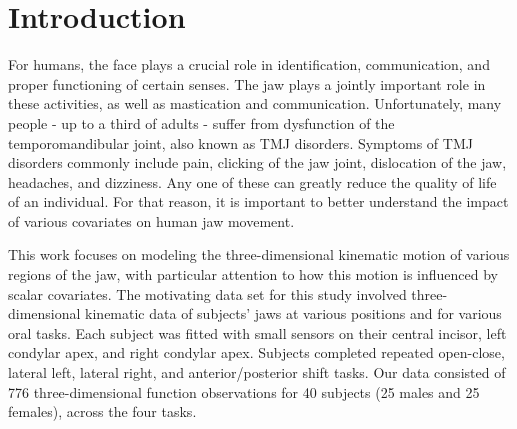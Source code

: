 \documentclass[AMA,Times1COL]{WileyNJDv5} %
\begin{document}



\maketitle



\section{Introduction}\label{sec1}

For humans, the face plays a crucial role in identification, communication, and proper functioning of certain senses.  The jaw plays a jointly important role in these activities, as well as mastication and communication.  Unfortunately, many people - up to a third of adults - suffer from dysfunction of the temporomandibular joint, also known as TMJ disorders\cite{buescher_temporomandibular_2007}.  Symptoms of TMJ disorders commonly include pain, clicking of the jaw joint, dislocation of the jaw, headaches, and dizziness.  Any one of these can greatly reduce the quality of life of an individual.  For that reason, it is important to better understand the impact of various covariates on human jaw movement.  

This work focuses on modeling the three-dimensional kinematic motion of various regions of the jaw, with particular attention to how this motion is influenced by scalar covariates.  The motivating data set for this study involved three-dimensional kinematic data of subjects' jaws at various positions and for various oral tasks.  Each subject was fitted with small sensors on their central incisor, left condylar apex, and right condylar apex.  Subjects completed repeated open-close, lateral left, lateral right, and anterior/posterior shift tasks.  Our data consisted of 776 three-dimensional function observations for 40 subjects (25 males and 25 females), across the four tasks.  
\end{document}
